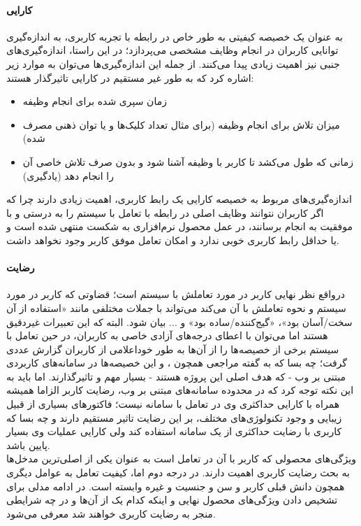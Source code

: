 \paragraph{کارایی}
به عنوان یک خصیصه کیفیتی به طور خاص در رابطه با تجربه کاربری، به اندازه‌گیری توانایی کاربران در انجام وظایف مشخصی می‌پردازد؛ در این راستا، اندازه‌گیری‌های جنبی نیز اهمیت زیادی پیدا می‌کنند. از جمله این اندازه‌گیری‌ها می‌توان به موارد زیر اشاره کرد که به طور غیر مستقیم در کارایی تاثیرگذار هستند:
\begin{itemize}
	\item 
	زمان سپری شده برای انجام وظیفه
	\item 
	میزان تلاش برای انجام وظیفه (برای مثال تعداد کلیک‌ها و یا توان ذهنی مصرف شده)
	\item 
	زمانی که طول می‌کشد تا کاربر با وظیفه آشنا شود و بدون صرف تلاش خاصی آن را انجام دهد (یادگیری)
\end{itemize}
اندازه‌گیری‌های مربوط به خصیصه کارایی یک رابط کاربری، اهمیت زیادی دارند چرا که اگر کاربران نتوانند وظایف اصلی در رابطه با تعامل با سیستم را به درستی و با موفقیت به انجام برسانند، در عمل محصول نرم‌افزاری به شکست منتهی شده است و یا حداقل رابط کاربری خوبی ندارد و امکان تعامل موفق کاربر وجود نخواهد داشت.
\paragraph{رضایت}
درواقع نظر نهایی کاربر در مورد تعاملش با سیستم است؛ قضاوتی که کاربر در مورد سیستم و نحوه تعاملش با آن می‌کند می‌تواند با جملات مختلفی مانند «استفاده از آن سخت/آسان بود»، «گیج‌کننده/ساده بود» و ... بیان شود. البته که این تعبیرات غیردقیق هستند اما می‌توان با اعطای درجه‌های آزادی خاصی به کاربران، در حین تعامل با سیستم برخی از خصیصه‌ها را از آن‌ها به طور خوداعلامی از کاربران گزارش عددی گرفت؛ چه بسا که به گفته مراجعی همچون
\cite{albert_measuring_2013}،
\cite{alonso-rios_usability:_2009} و
\cite{seffah_usability_2006}
این خصیصه‌ها در سامانه‌های کاربردی مبتنی بر وب - که هدف اصلی این پروژه هستند - بسیار مهم و تاثیرگذارند. اما باید به این نکته توجه کرد که در محدوده سامانه‌های مبتنی بر وب، رضایت کاربر الزاما همیشه همراه با کارایی حداکثری وی در تعامل با سامانه نیست؛ فاکتورهای بسیاری از قبیل زیبایی و وجود تکنولوژی‌های مختلف، بر این رضایت تاثیر مستقیم دارند و چه بسا که کاربری با رضایت حداکثری از یک سامانه استفاده کند ولی کارایی عملیات وی بسیار پایین باشد.\\
ویژگی‌های محصولی که کاربر با آن در تعامل است به عنوان یکی از اصلی‌ترین مدخل‌ها به بحث رضایت کاربری اهمیت دارند. در درجه دوم اما، کیفیت تعامل به عوامل دیگری همچون دانش قبلی کاربر و سن و جنسیت و غیره وابسته است. در ادامه مدلی برای تشخیص دادن ویژگی‌های محصول نهایی و اینکه کدام یک از آن‌ها و در چه شرایطی منجر به رضایت کاربری خواهند شد معرفی می‌شود.
